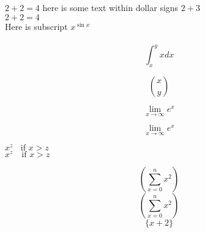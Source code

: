 \documentclass{article}
\begin{document}
\noindent$      2 + 2 =4$ here is some text within dollar signs $2+3    $\\
$2+2=4$\\
Here is subscript $x^{\sin{x}}$
\\
\\
$$\int_{x}^{y} xdx$$

$$\binom{x}{y}$$

$$\lim_{x \to \infty} e^x$$

$$\lim_{x \rightarrow \infty} e^x$$

\noindent $x^z \ \ \ \ \text{if } x>z$\\
$x^z \quad \text{if } x>z$

$$(\sum _{x=0}^{n} x^2)$$
$$\left(\sum _{x=0}^{n} x^2 \right)$$
$$\{x+2\}$$
\end{document}
